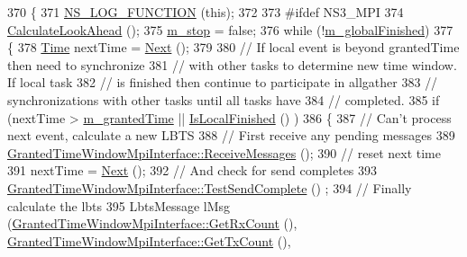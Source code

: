 \begin{DoxyCode}
370 \{
371   \hyperlink{log-macros-disabled_8h_a90b90d5bad1f39cb1b64923ea94c0761}{NS\_LOG\_FUNCTION} (\textcolor{keyword}{this});
372 
373 \textcolor{preprocessor}{#ifdef NS3\_MPI}
374   \hyperlink{classns3_1_1DistributedSimulatorImpl_a9f0890339d4631f5eeda05ac46cc824f}{CalculateLookAhead} ();
375   \hyperlink{classns3_1_1DistributedSimulatorImpl_aeda2f900518205bb35085c6b735f55ad}{m\_stop} = \textcolor{keyword}{false};
376   \textcolor{keywordflow}{while} (!\hyperlink{classns3_1_1DistributedSimulatorImpl_a90cc2380329f315b75bd414062b04cd8}{m\_globalFinished})
377     \{
378       \hyperlink{namespacens3_1_1TracedValueCallback_a7ffd3e7c142ffe7c8a1d2db9b8de38ec}{Time} nextTime = \hyperlink{classns3_1_1DistributedSimulatorImpl_a47bd05a3f2095f0935ef3ed60ceac4dc}{Next} ();
379 
380       \textcolor{comment}{// If local event is beyond grantedTime then need to synchronize}
381       \textcolor{comment}{// with other tasks to determine new time window. If local task}
382       \textcolor{comment}{// is finished then continue to participate in allgather}
383       \textcolor{comment}{// synchronizations with other tasks until all tasks have}
384       \textcolor{comment}{// completed.}
385       \textcolor{keywordflow}{if} (nextTime > \hyperlink{classns3_1_1DistributedSimulatorImpl_a2b793ea16a0f2e786742813d2bcdc2f4}{m\_grantedTime} || \hyperlink{classns3_1_1DistributedSimulatorImpl_ada1dd28c3da4462ea8a2acd60ff5ad96}{IsLocalFinished} () )
386         \{
387           \textcolor{comment}{// Can't process next event, calculate a new LBTS}
388           \textcolor{comment}{// First receive any pending messages}
389           \hyperlink{classns3_1_1GrantedTimeWindowMpiInterface_a25a6699dcab1ab2e348e0b5a2c90aa42}{GrantedTimeWindowMpiInterface::ReceiveMessages} ();
390           \textcolor{comment}{// reset next time}
391           nextTime = \hyperlink{classns3_1_1DistributedSimulatorImpl_a47bd05a3f2095f0935ef3ed60ceac4dc}{Next} ();
392           \textcolor{comment}{// And check for send completes}
393           \hyperlink{classns3_1_1GrantedTimeWindowMpiInterface_a517789eabe6a386e850cffb7e4d1a0dc}{GrantedTimeWindowMpiInterface::TestSendComplete} ()
      ;
394           \textcolor{comment}{// Finally calculate the lbts}
395           LbtsMessage lMsg (\hyperlink{classns3_1_1GrantedTimeWindowMpiInterface_a3b4a3753c629cabf580da859d9e23c22}{GrantedTimeWindowMpiInterface::GetRxCount}
       (), \hyperlink{classns3_1_1GrantedTimeWindowMpiInterface_a672feee70ece2b9a40dc60bc796e1c18}{GrantedTimeWindowMpiInterface::GetTxCount} (), 

\end{DoxyCode}
